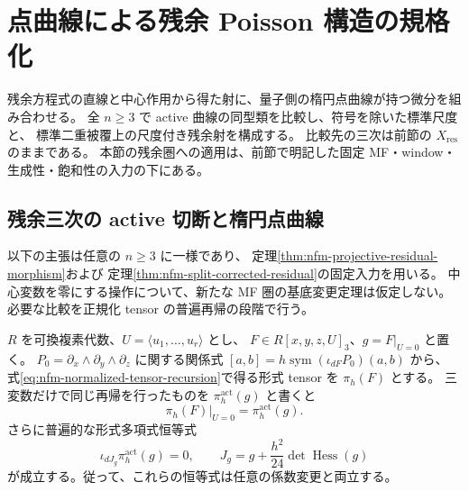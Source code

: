 \section{点曲線による残余 Poisson 構造の規格化}
\label{sec:nfm-residual-point-scale}

残余方程式の直線と中心作用から得た射に、量子側の楕円点曲線が持つ微分を組み合わせる。
全 $n\ge3$ で active 曲線の同型類を比較し、符号を除いた標準尺度と、
標準二重被覆上の尺度付き残余射を構成する。
比較先の三次は前節の $X_{\mathrm{res}}$ のままである。
本節の残余圏への適用は、前節で明記した固定 MF・window・生成性・飽和性の入力の下にある。

\subsection{残余三次の active 切断と楕円点曲線}

以下の主張は任意の $n\geq3$ に一様であり、
定理\ref{thm:nfm-projective-residual-morphism}および
定理\ref{thm:nfm-split-corrected-residual}の固定入力を用いる。
中心変数を零にする操作について、新たな MF 圏の基底変更定理は仮定しない。
必要な比較を正規化 tensor の普遍再帰の段階で行う。

\begin{lemma}
\label{lem:nfm-active-restriction-all-orders}
$R$ を可換複素代数、$U=\langle u_1,\ldots,u_r\rangle$ とし、
$F\in R[x,y,z,U]_3$、$g=F|_{U=0}$ と置く。
$P_0=\partial_x\wedge\partial_y\wedge\partial_z$ に関する関係式
$[a,b]=h\operatorname{sym}(\iota_{dF}P_0)(a,b)$ から、
式\eqref{eq:nfm-normalized-tensor-recursion}で得る形式 tensor を $\pi_h(F)$ とする。
三変数だけで同じ再帰を行ったものを $\pi_h^{\mathrm{act}}(g)$ と書くと
\[
 \pi_h(F)|_{U=0}=\pi_h^{\mathrm{act}}(g).
\]
さらに普遍的な形式多項式恒等式
\begin{equation}\label{eq:nfm-active-hessian-casimir}
 \iota_{dJ_g}\pi_h^{\mathrm{act}}(g)=0,
 \qquad J_g=g+\frac{h^2}{24}\det\operatorname{Hess}(g)
\end{equation}
が成立する。従って、これらの恒等式は任意の係数変更と両立する。
\end{lemma}

